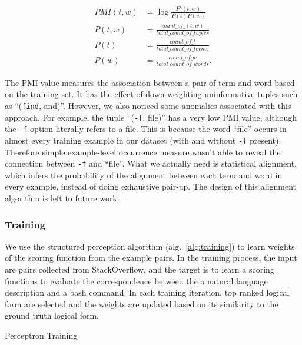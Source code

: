 \begin{align}
	PMI(t, w) &= \log{\frac{P^2(t,w)}{P(t)P(w)}} \\
	P(t, w) &= \frac{count\_of\_(t,w)}{total\_count\_of\_tuples} \\
	P(t) &= \frac{count\_of\_t}{total\_count\_of\_terms} \\
	P(w) &= \frac{count\_of\_w}{total\_count\_of\_words}.
\end{align}

The PMI value measures the association between a pair of term and word based on the training set. It has the effect of down-weighting uninformative tuples such as ``(\texttt{find}, and)''. However, we also noticed some anomalies associated with this approach. For example, the tuple ``(\texttt{-f}, file)'' has a very low PMI value, although the \texttt{-f} option literally refers to a file. This is because the word ``file'' occurs in almost every training example in our dataset (with and without \texttt{-f} present). Therefore simple example-level occurrence measure wasn't able to reveal the connection between \texttt{-f} and ``file''. What we actually need is statistical alignment, which infers the probability of the alignment between each term and word in every example, instead of doing exhaustive pair-up. The design of this alignment algorithm is left to future work. 

\subsubsection{Training}
\label{subsec:training}

We use the structured perception algorithm (alg.~\ref{alg:training}) to learn weights of the scoring function from the example pairs. In the training process, the input are pairs collected from StackOverflow, and the target is to learn a scoring functions to evaluate the correspondence between the a natural language description and a bash command. In each training iteration, top ranked logical form are selected and the weights are updated based on its similarity to the ground truth logical form. 

\begin{algorithm} 
\caption{Perceptron Training\label{alg:training}}
\end{algorithm}
